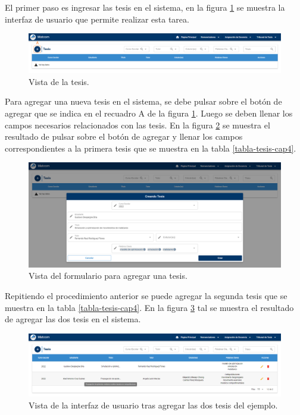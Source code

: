 El primer paso es ingresar las tesis en el sistema,
en la figura \ref{img-tc-thesis} se muestra la interfaz de usuario
que permite realizar esta tarea.


\begin{figure}[H]
    \includegraphics[scale=0.3]{Graphics/Implementation/Tesis/thesis-empty.png}
    \caption{Vista de la tesis.}
    \label{img-tc-thesis}
\end{figure}


Para agregar una nueva tesis en el sistema, se debe pulsar sobre el botón 
de agregar que se indica en el recuadro A de la figura \ref{img-tc-thesis}.
Luego se deben llenar los campos necesarios relacionados con las tesis. En la figura
\ref{img-tc-thesis-form} se muestra el resultado de pulsar sobre el botón de agregar y llenar los campos 
correspondientes a la primera tesis que se muestra en la tabla \ref{tabla-tesis-cap4}.

\begin{figure}[H]
    \includegraphics[scale=0.3]{Graphics/Implementation/Tesis/thesis-form.png}
    \caption{Vista del formulario para agregar una tesis.}
    \label{img-tc-thesis-form}
\end{figure}


Repitiendo el procedimiento anterior se puede agregar la segunda tesis que se 
muestra en la tabla \ref{tabla-tesis-cap4}. En la figura \ref{img-tc-thesis-result} tal
se muestra el resultado de agregar las dos tesis en el sistema.

\begin{figure}[H]
    \includegraphics[scale=0.3]{Graphics/Implementation/Tesis/thesis-result.png}
    \caption{Vista de la interfaz de usuario tras agregar las dos tesis del ejemplo.}
    \label{img-tc-thesis-result}
\end{figure}

